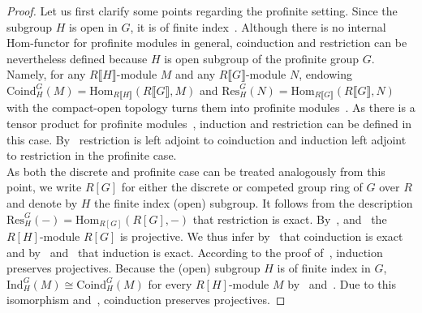 \documentclass[12pt, a4paper]{article}
\numberwithin{equation}{section}
\theoremstyle{empty}
\theoremstyle{nonumberplain}
\newtheorem{proof}{Proof}
\begin{document}
\begin{proof}
Let us first clarify some points regarding the profinite setting. Since the subgroup $H$ is open in $G$, it is of finite index~\cite[Lemma~0.3.1]{wil98}. Although there is no internal Hom-functor for profinite modules in general, coinduction and restriction can be nevertheless defined because $H$ is open subgroup of the profinite group $G$. Namely, for any $R{\llbracket}H{\rrbracket}$-module $M$ and any $R{\llbracket}G{\rrbracket}$-module $N$, endowing $\mathrm{Coind}_H^G(M) = \mathrm{Hom}_{R{\llbracket}H{\rrbracket}}(R{\llbracket}G{\rrbracket}, M)$ and $\mathrm{Res}_H^G(N) = \mathrm{Hom}_{R{\llbracket}G{\rrbracket}}(R{\llbracket}G{\rrbracket}, N)$ with the compact-open topology turns them into profinite modules~\cite[p.~369--371]{sym00}. As there is a tensor product for profinite modules~\cite[p.~177/191]{rib10}, induction and restriction can be defined in this case. By~\cite[Lemma~7.8]{bog16} restriction is left adjoint to coinduction and induction left adjoint to restriction in the profinite case. \\

As both the discrete and profinite case can be treated analogously from this point, we write $R[G]$ for either the discrete or competed group ring of $G$ over $R$ and denote by $H$ the finite index (open) subgroup. It follows from the description $\mathrm{Res}_H^G(-) = \mathrm{Hom}_{R[G]}(R[G], -)$ that restriction is exact. By~\cite[Proposition~I.3.1]{bro82}, \cite[Proposition~5.4.2]{rib10} and~\cite[Proposition~5.7.1]{rib10} the $R[H]$-module $R[G]$ is projective. We thus infer by~\cite[Lemma~2.2.3]{wei94} that coinduction is exact and by~\cite[Proposition~5.5.3]{rib10} and~\cite[p.~68]{wei94} that induction is exact. According to the proof of~\cite[Corollary~7.9]{bog16}, induction preserves projectives. Because the (open) subgroup $H$ is of finite index in $G$, $\mathrm{Ind}_H^G(M) \cong \mathrm{Coind}_H^G(M)$ for every $R[H]$-module $M$ by~\cite[Proposition~III.5.9]{bro82} and~\cite[p.~371]{sym00}. Due to this isomorphism and~\cite[Lemma~2.2.3]{wei94}, coinduction preserves projectives.
\end{proof}
\end{document}
